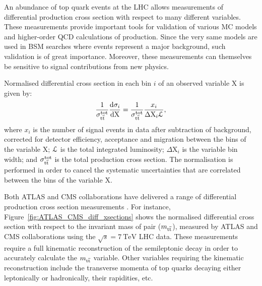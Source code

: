 An abundance of top quark events at the LHC allows measurements of differential \ttbar production cross section with
respect to many different variables. These measurements provide important tools for validation of various MC models and
higher-order QCD calculations of \ttbar production. Since the very same models are used in BSM searches where \ttbar
events represent a major background, such validation is of great importance. Moreover, these measurements can themselves
be sensitive to signal contributions from new physics.

Normalised differential cross section in each bin $i$ of an observed variable $\mathrm{X}$ is given by:
\begin{equation}
\label{eq:normalised_differential_xsection_theory}
\frac{1}{\sigma_{\mathrm{t}\overline{\mathrm{t}}}^\mathrm{tot}} \frac{\mathrm{d}\sigma_i}{\mathrm{d} \mathrm{X}} = \frac{1}{\sigma_{\mathrm{t}\overline{\mathrm{t}}}^\mathrm{tot}}
\frac{x_i}{\Delta \mathrm{X}_i \mathcal{L}},
\end{equation}
where $x_i$ is the number of signal events in data after subtraction of background, corrected for detector efficiency,
acceptance and migration between the bins of the variable $\mathrm{X}$; $\mathcal{L}$ is the total integrated luminosity;
$\Delta \mathrm{X}_i$ is the variable bin width; and $\sigma_{\mathrm{t}\overline{\mathrm{t}}}^\mathrm{tot}$ is the total \ttbar production cross
section. The normalisation is performed in order to cancel the systematic uncertainties that are correlated between the
bins of the variable $\mathrm{X}$.

Both ATLAS and CMS collaborations have delivered a range of differential \ttbar production cross section measurements
\autocite{ATLAS_diff_xsections_7TeV, CMS_diff_xsections_7TeV}. For instance, Figure~\ref{fig:ATLAS_CMS_diff_xsections}
shows the normalised differential cross section with respect to the invariant mass of \ttbar pair ($m_{\mathrm{t}\overline{\mathrm{t}}}$),
measured by ATLAS and CMS collaborations using the $\sqrt{s} = \SI{7}{\TeV}$ LHC data. These measurements require a full
kinematic reconstruction of the semileptonic \ttbar decay in order to accurately calculate the $m_{\mathrm{t}\overline{\mathrm{t}}}$ variable.
Other variables requiring the kinematic reconstruction include the transverse momenta of top quarks decaying either
leptonically or hadronically, their rapidities, etc.

